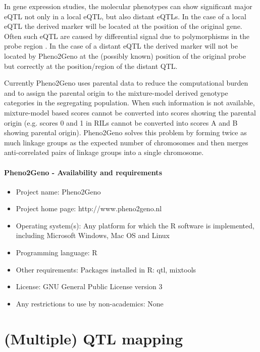\documentclass[8pt, twoside, a5paper]{report}
\begin{document}
In gene expression studies, the molecular phenotypes can show significant major eQTL not only in a local eQTL, but also distant eQTLs. 
In the case of a local eQTL the derived marker will be located at the position of the original gene. Often such eQTL are caused by 
differential signal due to polymorphisms in the probe region \cite{Alberts:2005,Alberts:2007}. In the case of a distant eQTL the 
derived marker will not be located by Pheno2Geno at the (possibly known) position of the original probe but correctly at the 
position/region of the distant QTL. \newline

Currently Pheno2Geno uses parental data to reduce the computational burden and to assign the parental origin to the mixture-model 
derived genotype categories in the segregating population. When such information is not available, mixture-model based scores 
cannot be converted into scores showing the parental origin (e.g. scores 0 and 1 in RILs cannot be converted into scores A and B 
showing parental origin). Pheno2Geno solves this problem by forming twice as much linkage groups as the expected number of 
chromosomes and then merges anti-correlated pairs of linkage groups into a single chromosome. \newline

\subsubsection{Pheno2Geno - Availability and requirements}
\begin{itemize}
\item Project name: Pheno2Geno
\item Project home page: http://www.pheno2geno.nl
\item Operating system(s): Any platform for which the R software \cite{rgui} is implemented, including Microsoft Windows, Mac OS and Linux
\item Programming language: R
\item Other requirements: Packages installed in R: qtl, mixtools \cite{Benaglia:2009}
\item License: GNU General Public License version 3
\item Any restrictions to use by non-academics: None
\end{itemize}




\chapter{(Multiple) QTL mapping}
\end{document}
